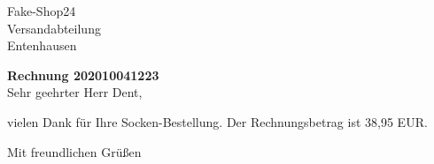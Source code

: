 \documentclass[german,a4,12pt]{scrlttr2}
\begin{document}
\begin{letter}{Fake-Shop24\\ Versandabteilung\\ Entenhausen}

\opening{\textbf{Rechnung 202010041223}\\[1cm] Sehr geehrter Herr Dent,}

vielen Dank für Ihre Socken-Bestellung. Der Rechnungsbetrag ist 38,95 EUR.

\closing{Mit freundlichen Grüßen}

\end{letter}
\end{document}
